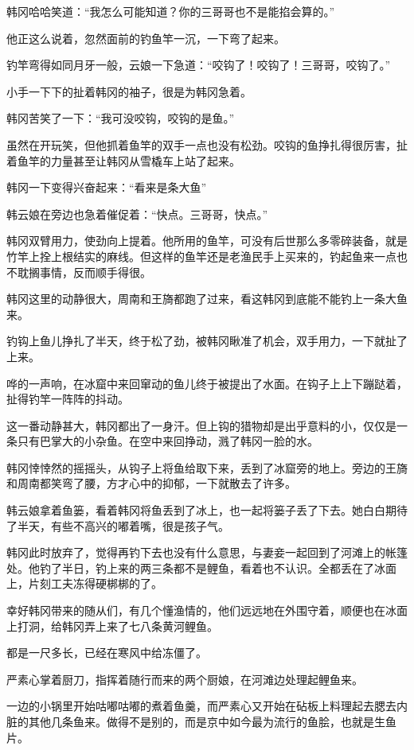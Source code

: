 韩冈哈哈笑道：“我怎么可能知道？你的三哥哥也不是能掐会算的。”

他正这么说着，忽然面前的钓鱼竿一沉，一下弯了起来。

钓竿弯得如同月牙一般，云娘一下急道：“咬钩了！咬钩了！三哥哥，咬钩了。”

小手一下下的扯着韩冈的袖子，很是为韩冈急着。

韩冈苦笑了一下：“我可没咬钩，咬钩的是鱼。”

虽然在开玩笑，但他抓着鱼竿的双手一点也没有松劲。咬钩的鱼挣扎得很厉害，扯着鱼竿的力量甚至让韩冈从雪橇车上站了起来。

韩冈一下变得兴奋起来：“看来是条大鱼”

韩云娘在旁边也急着催促着：“快点。三哥哥，快点。”

韩冈双臂用力，使劲向上提着。他所用的鱼竿，可没有后世那么多零碎装备，就是竹竿上拴上根结实的麻线。但这样的鱼竿还是老渔民手上买来的，钓起鱼来一点也不耽搁事情，反而顺手得很。

韩冈这里的动静很大，周南和王旖都跑了过来，看这韩冈到底能不能钓上一条大鱼来。

钓钩上鱼儿挣扎了半天，终于松了劲，被韩冈瞅准了机会，双手用力，一下就扯了上来。

哗的一声响，在冰窟中来回窜动的鱼儿终于被提出了水面。在钩子上上下蹦跶着，扯得钓竿一阵阵的抖动。

这一番动静甚大，韩冈都出了一身汗。但上钩的猎物却是出乎意料的小，仅仅是一条只有巴掌大的小杂鱼。在空中来回挣动，溅了韩冈一脸的水。

韩冈悻悻然的摇摇头，从钩子上将鱼给取下来，丢到了冰窟旁的地上。旁边的王旖和周南都笑弯了腰，方才心中的抑郁，一下就散去了许多。

韩云娘拿着鱼篓，看着韩冈将鱼丢到了冰上，也一起将篓子丢了下去。她白白期待了半天，有些不高兴的嘟着嘴，很是孩子气。

韩冈此时放弃了，觉得再钓下去也没有什么意思，与妻妾一起回到了河滩上的帐篷处。他钓了半日，钓上来的两三条都不是鲤鱼，看着也不认识。全都丢在了冰面上，片刻工夫冻得硬梆梆的了。

幸好韩冈带来的随从们，有几个懂渔情的，他们远远地在外围守着，顺便也在冰面上打洞，给韩冈弄上来了七八条黄河鲤鱼。

都是一尺多长，已经在寒风中给冻僵了。

严素心掌着厨刀，指挥着随行而来的两个厨娘，在河滩边处理起鲤鱼来。

一边的小锅里开始咕嘟咕嘟的煮着鱼羹，而严素心又开始在砧板上料理起去腮去内脏的其他几条鱼来。做得不是别的，而是京中如今最为流行的鱼脍，也就是生鱼片。

